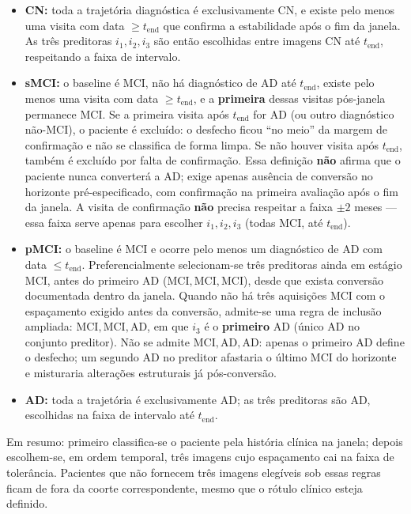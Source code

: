 \documentclass[review]{elsarticle}
\begin{document}
	\begin{itemize}
		\item \textbf{CN:} toda a trajetória diagnóstica é exclusivamente CN, e existe pelo menos uma visita com data $\ge t_{\mathrm{end}}$ que confirma a estabilidade após o fim da janela.
		As três preditoras $i_1,i_2,i_3$ são então escolhidas entre imagens CN até $t_{\mathrm{end}}$, respeitando a faixa de intervalo.
		
		\item \textbf{sMCI:} o baseline é MCI, não há diagnóstico de AD até $t_{\mathrm{end}}$, existe pelo menos uma visita com data $\ge t_{\mathrm{end}}$, e a \textbf{primeira} dessas visitas pós-janela permanece MCI.
		Se a primeira visita após $t_{\mathrm{end}}$ for AD (ou outro diagnóstico não-MCI), o paciente é excluído: o desfecho ficou ``no meio'' da margem de confirmação e não se classifica de forma limpa.
		Se não houver visita após $t_{\mathrm{end}}$, também é excluído por falta de confirmação.
		Essa definição \textbf{não} afirma que o paciente nunca converterá a AD; exige apenas ausência de conversão no horizonte pré-especificado, com confirmação na primeira avaliação após o fim da janela.
		A visita de confirmação \textbf{não} precisa respeitar a faixa $\pm 2$ meses --- essa faixa serve apenas para escolher $i_1,i_2,i_3$ (todas MCI, até $t_{\mathrm{end}}$).
		
		\item \textbf{pMCI:} o baseline é MCI e ocorre pelo menos um diagnóstico de AD com data $\le t_{\mathrm{end}}$.
		Preferencialmente selecionam-se três preditoras ainda em estágio MCI, antes do primeiro AD ($\mathrm{MCI},\mathrm{MCI},\mathrm{MCI}$), desde que exista conversão documentada dentro da janela.
		Quando não há três aquisições MCI com o espaçamento exigido antes da conversão, admite-se uma regra de inclusão ampliada: $\mathrm{MCI},\mathrm{MCI},\mathrm{AD}$, em que $i_3$ é o \textbf{primeiro} AD (único AD no conjunto preditor).
		Não se admite $\mathrm{MCI},\mathrm{AD},\mathrm{AD}$: apenas o primeiro AD define o desfecho; um segundo AD no preditor afastaria o último MCI do horizonte e misturaria alterações estruturais já pós-conversão.
		
		\item \textbf{AD:} toda a trajetória é exclusivamente AD; as três preditoras são AD, escolhidas na faixa de intervalo até $t_{\mathrm{end}}$.
	\end{itemize}
	
	Em resumo: primeiro classifica-se o paciente pela história clínica na janela; depois escolhem-se, em ordem temporal, três imagens cujo espaçamento cai na faixa de tolerância.
	Pacientes que não fornecem três imagens elegíveis sob essas regras ficam de fora da coorte correspondente, mesmo que o rótulo clínico esteja definido.
\end{document}
